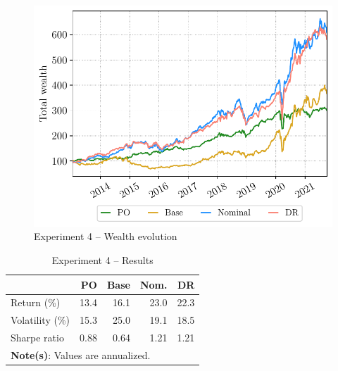 \documentclass[10pt, twocolumn]{article}
\theoremstyle{plain}
\theoremstyle{definition}
\begin{document}
\begin{figure}[ht]
\begin{center}
\centerline{\includegraphics[width=\columnwidth]{figs/wealth_exp4.pdf}}
\caption{Experiment 4 -- Wealth evolution}
\label{fig:exp4_wealth}
\end{center}
\vskip -0.2in
\end{figure}

\begin{table}[t]
\caption{Experiment 4 -- Results}
\centering
\begin{tabular}{lrrrr}
\toprule
				& PO & Base & Nom. & DR \\
\midrule
Return (\%)     & 13.4 & 16.1 & 23.0 & 22.3 \\
Volatility (\%) & 15.3 & 25.0 & 19.1 & 18.5 \\
Sharpe ratio    & 0.88 & 0.64 & 1.21 & 1.21 \\
\bottomrule
\multicolumn{5}{p{0.6\linewidth}}{\small\rule{0pt}{3ex}\textbf{Note(s)}: Values are annualized.}\\
\end{tabular}
\label{table:exp4_results}
\end{table}

\end{document}
